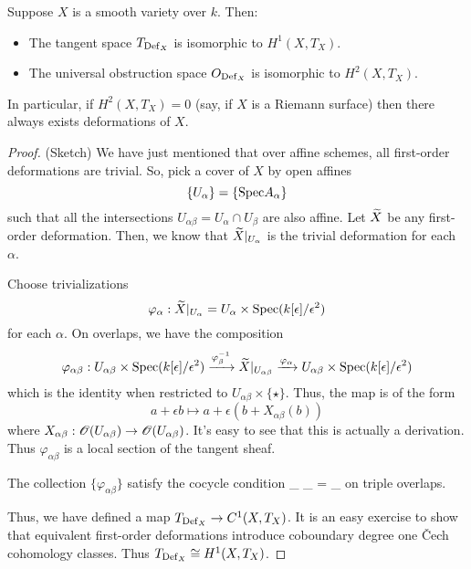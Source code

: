 \documentclass[11pt]{amsart}
\def\Spec{{\rm Spec}}
\begin{document}
\begin{thm}
Suppose $X$ is a smooth variety over $k$. 
Then:
\begin{itemize}
\item The tangent space $T_{{\rm Def}_X}$ is isomorphic to $H^1(X, T_X)$. 
\item The universal obstruction space $O_{{\rm Def}_X}$ is isomorphic to $H^2(X, T_X)$. 
\end{itemize}
In particular, if $H^2(X, T_X) = 0$ (say, if $X$ is a Riemann surface) then there always exists deformations of $X$. 
\end{thm}

\begin{proof} 
(Sketch)
We have just mentioned that over affine schemes, all first-order deformations are trivial. 
So, pick a cover of $X$ by open affines
\[
\{U_\alpha\} = \{\Spec A_\alpha\}
\] 
such that all the intersections $U_{\alpha\beta} = U_{\alpha} \cap U_\beta$ are also affine. 
Let $\Tilde{X}$ be any first-order deformation.
Then, we know that $\Tilde{X}|_{U_\alpha}$ is the trivial deformation for each $\alpha$. 

Choose trivializations
\[
\varphi_\alpha : \Tilde{X}|_{U_\alpha} = U_\alpha \times \Spec(k[\epsilon]/\epsilon^2)
\]
for each $\alpha$.
On overlaps, we have the composition
\[
\varphi_{\alpha \beta} :  U_{\alpha\beta} \times \Spec(k[\epsilon]/\epsilon^2) \xto{\varphi_{\beta}^{-1}} \Tilde{X}|_{U_{\alpha\beta}} \xto{\varphi_\alpha} U_{\alpha\beta} \times \Spec(k[\epsilon]/\epsilon^2) 
\]
which is the identity when restricted to $U_{\alpha\beta} \times \{\star\}$.
Thus, the map is of the form
\[
a + \epsilon b \mapsto a + \epsilon(b + X_{\alpha\beta} (b))
\]
where $X_{\alpha \beta} : \sO(U_{\alpha\beta}) \to \sO(U_{\alpha\beta})$. 
It's easy to see that this is actually a derivation. 
Thus $\varphi_{\alpha\beta}$ is a local section of the tangent sheaf. 

The collection $\{\varphi_{\alpha \beta}\}$ satisfy the cocycle condition
\beqn\label{cocycle}
\varphi_{\alpha\beta} \circ \varphi_{\beta \gamma} = \varphi_{\alpha \gamma}
\eeqn
on triple overlaps. 

Thus, we have defined a map $T_{\Def_X} \to {C}^1(X, T_X)$. 
It is an easy exercise to show that equivalent first-order deformations introduce coboundary degree one \v{C}ech cohomology classes. 
Thus $T_{\Def_X} \cong H^1(X, T_X)$. 


\end{proof}
\end{document}
